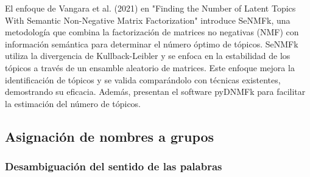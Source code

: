 El enfoque de Vangara et al. (2021) en "Finding the Number of Latent Topics With Semantic Non-Negative Matrix Factorization" introduce SeNMFk, una metodología que combina la factorización de matrices no negativas (NMF) con información semántica para determinar el número óptimo de tópicos. SeNMFk utiliza la divergencia de Kullback-Leibler y se enfoca en la estabilidad de los tópicos a través de un ensamble aleatorio de matrices. Este enfoque mejora la identificación de tópicos y se valida comparándolo con técnicas existentes, demostrando su eficacia. Además, presentan el software pyDNMFk para facilitar la estimación del número de tópicos.

\subsection{Asignaci\'on de nombres a grupos}

\subsubsection{Desambiguaci\'on del sentido de las palabras}